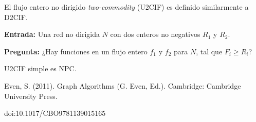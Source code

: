 \documentclass[12pt,letterpaper]{article}
\begin{document}
El flujo entero no dirigido \emph{two-commodity} (U2CIF) es definido similarmente a D2CIF.

\bigbreak

\textbf{Entrada:} Una red no dirigida $N$ con dos enteros no negativos $R_1$ y $R_2$.

\bigbreak

\textbf{Pregunta:} ¿Hay funciones en un flujo entero $f_1$ y $f_2$ para $N$, tal que $F_i \geq R_i$?

\begin{theorem}
    U2CIF simple es NPC.
\end{theorem}



\begin{thebibliography}{}

    \bibitem{}
    Even, S. (2011). Graph Algorithms (G. Even, Ed.). Cambridge: Cambridge University Press.
    
    doi:10.1017/CBO9781139015165

\end{thebibliography}
\end{document}
